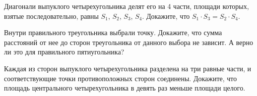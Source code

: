 \begin{problems}
\item
Диагонали выпуклого четырехугольника делят его на 4 части, площади которых,
взятые последовательно, равны $S_1$, $S_2$, $S_3$, $S_4$.
Докажите, что $S_1 \cdot S_3 = S_2 \cdot S_4$.

\item
Внутри правильного треугольника выбрали точку.
Докажите, что сумма расстояний от нее до сторон треугольника от данного выбора
не зависит.
А верно ли это для правильного пятиугольника?

\item
Каждая из сторон выпуклого четырехугольника разделена на три равные части,
и соответствующие точки противоположных сторон соединены.
Докажите, что площадь центрального четырехугольника в девять раз меньше площади
целого.

\end{problems}

